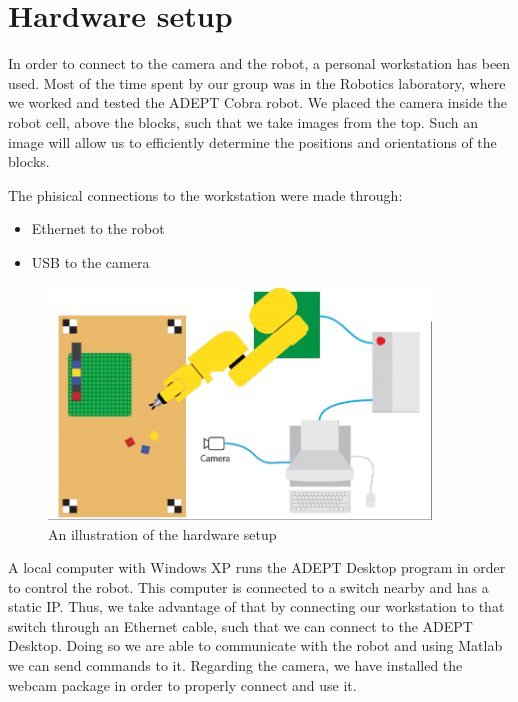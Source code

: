 \chapter{Hardware setup}\label{ch:hardware}
In order to connect to the camera and the robot, a personal workstation has been used. Most of the time spent by our group was in the Robotics laboratory, where we worked and tested the ADEPT Cobra robot. We placed the camera inside the robot cell, above the blocks, such that we take images from the top. Such an image will allow us to efficiently determine the positions and orientations of the blocks. 

The phisical connections to the workstation were made through: 
\begin{itemize}
	\item Ethernet to the robot  
	\item USB to the camera 
\end{itemize}

\begin{figure}[hb]
\centering
\includegraphics[width=4in]{figures/robotCellDesign.png}
\caption[robot Cell Design]
{An illustration of the hardware setup}
\end{figure}

A local computer with Windows XP runs the ADEPT Desktop program in order to control the robot. This computer is connected to a switch nearby and has a static IP. Thus, we take advantage of that by connecting our workstation to that switch through an Ethernet cable, such that we can connect to the ADEPT Desktop. Doing so we are able to communicate with the robot and using Matlab we can send commands to it. Regarding the camera, we have installed the webcam package in order to properly connect and use it. 
